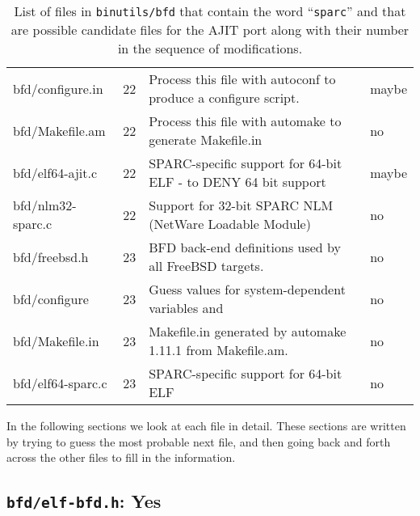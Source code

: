 \begin{table}[ht]
\begin{tabular}[h]{|l|c|p{.63\linewidth}|l|}
bfd/configure.in   &22&  Process this file with autoconf to produce a configure script.                            & maybe \\
bfd/Makefile.am    &22&  Process this file with automake to generate Makefile.in                                   & no    \\
bfd/elf64-ajit.c   &22&  SPARC-specific support for 64-bit ELF - to DENY 64 bit support                            & maybe \\
bfd/nlm32-sparc.c  &22&  Support for 32-bit SPARC NLM (NetWare Loadable Module)                                    & no    \\
bfd/freebsd.h      &23&  BFD back-end definitions used by all FreeBSD targets.                                     & no    \\
bfd/configure      &23&  Guess values for system-dependent variables and                                           & no    \\
bfd/Makefile.in    &23&  Makefile.in generated by automake 1.11.1 from Makefile.am.                                & no    \\
bfd/elf64-sparc.c  &23&  SPARC-specific support for 64-bit ELF                                                     & no    \\
\hline
\end{tabular}
\caption[List of files 5]{List of files in \texttt{binutils/bfd} that
  contain the word ``\texttt{sparc}'' and that are possible candidate
  files for the AJIT port along with their number in the sequence of
  modifications.} 
\label{tab:bfd:sparc:files:5}
\end{table}

In  the following  sections we  look at  each file  in  detail.  These
sections are written  by trying to guess the  most probable next file,
and then  going back and forth across  the other files to  fill in the
information.

\subsection{\texttt{bfd/elf-bfd.h}: Yes}
\label{sec:bfd:elf-bfd.h}


